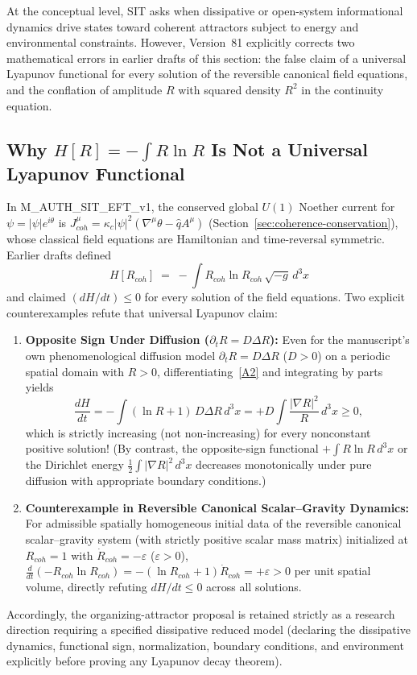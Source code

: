 \documentclass[american,11pt,letterpaper]{article}
\def\mathcal#1{#1}%
\def\mathrm#1{#1}%
\def\texttt#1{#1}%
\def\emph#1{#1}%
\begin{document}
At the conceptual level, SIT asks when dissipative or open-system informational dynamics drive states toward coherent attractors subject to energy and environmental constraints. However, Version~81 explicitly corrects two mathematical errors in earlier drafts of this section: the false claim of a universal Lyapunov functional for every solution of the reversible canonical field equations, and the conflation of amplitude $R$ with squared density $R^2$ in the continuity equation.

\subsection{Why $\mathcal{H}[R] = -\int R\ln R$ Is Not a Universal Lyapunov Functional}

In \texttt{M\_AUTH\_SIT\_EFT\_v1}, the conserved global $U(1)$ Noether current for $\psi = |\psi|e^{i\theta}$ is $J^\mu_{\mathrm{coh}} = \kappa_c|\psi|^2(\nabla^\mu\theta - \hat{q}A^\mu)$ (Section~\ref{sec:coherence-conservation}), whose classical field equations are Hamiltonian and time-reversal symmetric. Earlier drafts defined
\begin{equation}
\mathcal{H}[R_{\mathrm{coh}}]
   \;=\;
   -\!\int R_{\mathrm{coh}}\ln R_{\mathrm{coh}}\,
          \sqrt{-g}\,d^{3}x
\tag{A2}\label{A2}
\end{equation}
and claimed $(d\mathcal{H}/dt) \le 0$ for every solution of the field equations. Two explicit counterexamples refute that universal Lyapunov claim:
\begin{enumerate}[leftmargin=2em]
  \item \textbf{Opposite Sign Under Diffusion ($\partial_t R = D\Delta R$):} Even for the manuscript's own phenomenological diffusion model $\partial_t R = D\Delta R$ ($D > 0$) on a periodic spatial domain with $R > 0$, differentiating~\eqref{A2} and integrating by parts yields
  \[
  \frac{d\mathcal{H}}{dt}
  = -\int (\ln R + 1)\,D\Delta R\,d^3x
  = +D\int \frac{|\nabla R|^2}{R}\,d^3x \ge 0,
  \]
  which is strictly \emph{increasing} (not non-increasing) for every nonconstant positive solution! (By contrast, the opposite-sign functional $+\int R\ln R\,d^3x$ or the Dirichlet energy $\frac{1}{2}\int|\nabla R|^2\,d^3x$ decreases monotonically under pure diffusion with appropriate boundary conditions.)
  \item \textbf{Counterexample in Reversible Canonical Scalar--Gravity Dynamics:} For admissible spatially homogeneous initial data of the reversible canonical scalar--gravity system (with strictly positive scalar mass matrix) initialized at $R_{\mathrm{coh}} = 1$ with $\dot{R}_{\mathrm{coh}} = -\varepsilon$ ($\varepsilon > 0$), $\frac{d}{dt}(-R_{\mathrm{coh}}\ln R_{\mathrm{coh}}) = -(\ln R_{\mathrm{coh}} + 1)\dot{R}_{\mathrm{coh}} = +\varepsilon > 0$ per unit spatial volume, directly refuting $d\mathcal{H}/dt \le 0$ across all solutions.
\end{enumerate}
Accordingly, the organizing-attractor proposal is retained strictly as a research direction requiring a \emph{specified dissipative reduced model} (declaring the dissipative dynamics, functional sign, normalization, boundary conditions, and environment explicitly before proving any Lyapunov decay theorem).
\end{document}
